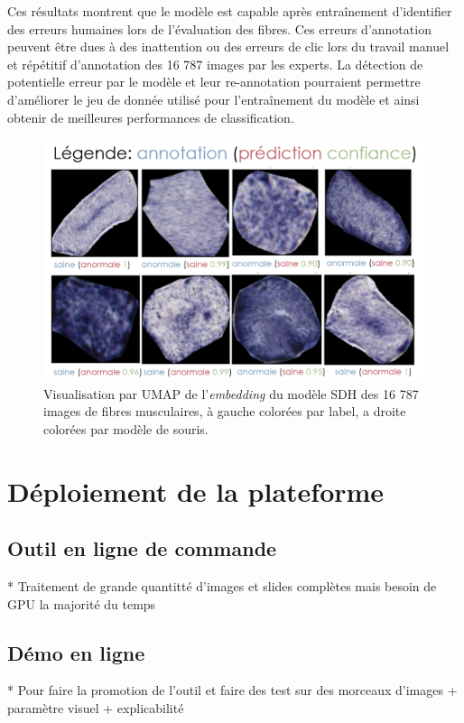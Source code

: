Ces résultats montrent que le modèle est capable après entraînement d'identifier des erreurs humaines lors de l'évaluation des fibres. Ces erreurs d'annotation peuvent être dues à des inattention ou des erreurs de clic lors du travail manuel et répétitif d'annotation des  16 787 images par les experts. La détection de potentielle erreur par le modèle et leur re-annotation pourraient permettre d'améliorer le jeu de donnée utilisé pour l'entraînement du modèle et ainsi obtenir de meilleures performances de classification.
\begin{figure}[htbp]
 \centering
 \includegraphics[width=1\textwidth]{figures/list_sdh_errors.png}
 \caption[Visualisation par UMAP de l'\textit{embedding} du modèle SDH]{Visualisation par UMAP de l'\textit{embedding} du modèle SDH des 16 787 images de fibres musculaires, à gauche colorées par label, a droite colorées par modèle de souris.}
 \label{fig:list_errors}
\end{figure}

\section{Déploiement de la plateforme}
\subsection{Outil en ligne de commande}
* Traitement de grande quantitté d'images et slides complètes mais besoin de GPU la majorité du temps
\subsection{Démo en ligne}
* Pour faire la promotion de l'outil et faire des test sur des morceaux d'images + paramètre visuel + explicabilité
